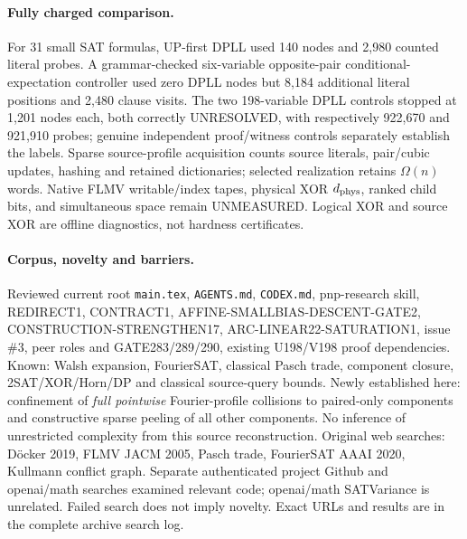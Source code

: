 \documentclass[11pt]{article}
\begin{document}
\paragraph{Fully charged comparison.} For 31 small SAT formulas, UP-first DPLL used 140 nodes and 2,980 counted literal probes. A grammar-checked six-variable opposite-pair conditional-expectation controller used zero DPLL nodes but 8,184 additional literal positions and 2,480 clause visits. The two 198-variable DPLL controls stopped at 1,201 nodes each, both correctly UNRESOLVED, with respectively 922,670 and 921,910 probes; genuine independent proof/witness controls separately establish the labels. Sparse source-profile acquisition counts source literals, pair/cubic updates, hashing and retained dictionaries; selected realization retains $\Omega(n)$ words. Native FLMV writable/index tapes, physical XOR $d_{\rm phys}$, ranked child bits, and simultaneous space remain UNMEASURED. Logical XOR and source XOR are offline diagnostics, not hardness certificates.
\paragraph{Corpus, novelty and barriers.} Reviewed current root \texttt{main.tex}, \texttt{AGENTS.md}, \texttt{CODEX.md}, pnp-research skill, REDIRECT1, CONTRACT1, AFFINE-SMALLBIAS-DESCENT-GATE2, CONSTRUCTION-STRENGTHEN17, ARC-LINEAR22-SATURATION1, issue \#3, peer roles and GATE283/289/290, existing U198/V198 proof dependencies. Known: Walsh expansion, FourierSAT, classical Pasch trade, component closure, 2SAT/XOR/Horn/DP and classical source-query bounds. Newly established here: confinement of \emph{full pointwise} Fourier-profile collisions to paired-only components and constructive sparse peeling of all other components. No inference of unrestricted complexity from this source reconstruction. Original web searches: D\"ocker 2019, FLMV JACM 2005, Pasch trade, FourierSAT AAAI 2020, Kullmann conflict graph. Separate authenticated project Github and openai/math searches examined relevant code; openai/math SATVariance is unrelated. Failed search does not imply novelty. Exact URLs and results are in the complete archive search log.
\end{document}

